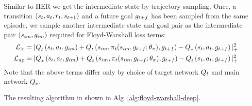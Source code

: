 Similar to HER we get the intermediate state by trajectory sampling. Once,
a transition $(\state_t, \act_t, \rew_t, \state_{t+1})$ and a future goal
$\goal_{t+f}$ has been sampled from the same episode, we sample another
intermediate state and goal pair as the intermediate pair $(\state_{im},
\goal_{im})$ required for Floyd-Warshall loss terms:
%
\begin{align}
  \LossLo &= |
      \fwargs{\state_{t}}{\act_t}{\goal_{im}}{t}{}
      + \fwargs{\state_{im}}{\policy_t(\state_{im}, \goal_{t+f};\param_\policy)}{\goal_{t+f}}{t}{}
      - \fwargs{\state_{t}}{\act_t}{\goal_{t+f}}{*}{}
      |_+^2
                         \\
  \LossUp &= |
      \fwargs{\state_{t}}{\act_t}{\goal_{im}}{*}{}
      + \fwargs{\state_{im}}{\policy_t(\state_{im}, \goal_{t+f};\param_\policy)}{\goal_{t+f}}{t}{}
      - \fwargs{\state_{t}}{\act_t}{\goal_{t+f}}{t}{}
      |_+^2
\end{align}%
% 
Note that the above terms differ only by choice of target network $\fw_t$ and
main network $\fw_*$. 
% 

The resulting algorithm in shown in Alg~\ref{alg:floyd-warshall-deep}.


